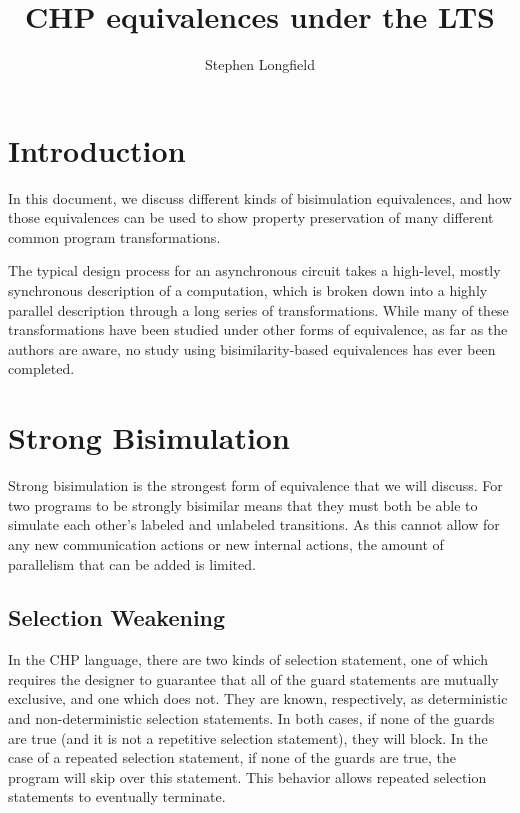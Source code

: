 \documentclass[times, 10pt]{article}
\title{CHP equivalences under the LTS}
\author{Stephen Longfield}
\begin{document}
\maketitle

\section{Introduction}

In this document, we discuss different kinds of bisimulation equivalences, and
how those equivalences can be used to show property preservation of many
different common program transformations.

The typical design process for an asynchronous circuit takes a high-level,
mostly synchronous description of a computation, which is broken down into a
highly parallel description through a long series of transformations. While many
of these transformations have been studied under other forms of equivalence, as
far as the authors are aware, no study using bisimilarity-based equivalences has
ever been completed.
 
\section{Strong Bisimulation}

Strong bisimulation is the strongest form of equivalence that we will discuss.
For two programs to be strongly bisimilar means that they must both be able to
simulate each other's labeled and unlabeled transitions. As this cannot allow
for any new communication actions or new internal actions, the amount of
parallelism that can be added is limited.

\subsection{Selection Weakening}

In the CHP language, there are two kinds of selection statement, one of which
requires the designer to guarantee that all of the guard statements are mutually
exclusive, and one which does not. They are known, respectively, as
deterministic and non-deterministic selection statements. In both cases, if none
of the guards are true (and it is not a repetitive selection statement), they
will block. In the case of a repeated selection statement, if none of the
guards are true, the program will skip over this statement. This behavior allows
repeated selection statements to eventually terminate.
\end{document}
